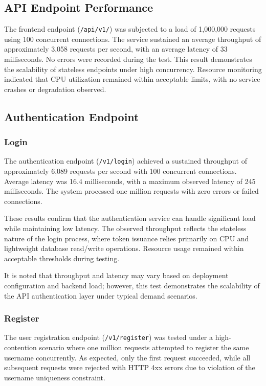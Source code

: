 \begin{table}[h!]
\caption{Scalability Test Results for API Endpoints: Performance Metrics (top), Upload Test (middle) and Setup (bottom).}
\label{tab:scalability-results}
\end{table}

\subsection{API Endpoint Performance}
The frontend endpoint (\texttt{/api/v1/}) was subjected to a load of 1,000,000 
requests using 100 concurrent connections. The service sustained an average 
throughput of approximately 3,058 requests per second, with an average latency 
of 33 milliseconds. No errors were recorded during the test. 
This result demonstrates the scalability of stateless endpoints
under high concurrency. Resource monitoring indicated that CPU utilization 
remained within acceptable limits, with no service crashes or degradation observed.


\subsection{Authentication Endpoint}

\subsubsection*{Login}
The authentication endpoint (\texttt{/v1/login}) achieved a sustained throughput of 
approximately 6,089 requests per second with 100 concurrent connections. Average 
latency was 16.4 milliseconds, with a maximum observed latency of 245 milliseconds. 
The system processed one million requests with zero errors or failed connections.

These results confirm that the authentication service can handle significant load 
while maintaining low latency. The observed throughput reflects the stateless nature 
of the login process, where token issuance relies primarily on CPU and lightweight 
database read/write operations. Resource usage remained within acceptable thresholds 
during testing.

It is noted that throughput and latency may vary based on deployment configuration 
and backend load; however, this test demonstrates the scalability of the API 
authentication layer under typical demand scenarios.

\subsubsection*{Register}
The user registration endpoint (\texttt{/v1/register}) was tested under a high-contention 
scenario where one million requests attempted to register the same username concurrently. 
As expected, only the first request succeeded, while all subsequent requests were rejected 
with HTTP 4xx errors due to violation of the username uniqueness constraint.

